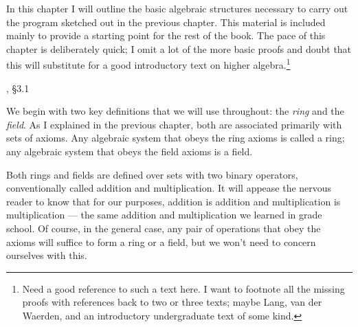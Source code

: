 

\begin{comment}
The author of a mathematics text, really any text in a technical
subject, is faced with a difficult choice --- how much to leave out?
How often to refer readers to references?  How much knowledge
to presuppose?

Now, in the early twenty-first century, we are faced with
technological changes that affect the author's approach.  First, we
have the ability to distribute very large books, file size being a
slight or absent impediment.  Also, we have a political and economic
structure that relies heavily on using copyright to restrict and
control information flow.  These factor have influenced me to decide
in favor of writing a larger and more comprehensive text, that aims to
introduce abstract algebra as much it tries to teach integration
theory.
\end{comment}

In this chapter I will outline the basic algebraic structures
necessary to carry out the program sketched out in the previous
chapter.  This material is included mainly to provide a starting point
for the rest of the book. The pace of this chapter is
deliberately quick; I omit a lot of the more basic proofs and doubt
that this will substitute for a good introductory text on higher
algebra.\footnote{Need a good reference to such a text here.
I want to footnote all the missing proofs with references
back to two or three texts; maybe Lang, van der Waerden,
and an introductory undergraduate text of some kind.}

, \S3.1

We begin with two key definitions that we will use throughout: the
{\it ring} and the {\it field}.  As I explained in the previous
chapter, both are associated primarily with sets of axioms.  Any
algebraic system that obeys the ring axioms is called a ring; any
algebraic system that obeys the field axioms is a field.

Both rings and fields are defined over sets with two binary operators,
conventionally called addition and multiplication.  It will appease
the nervous reader to know that for our purposes,
addition is addition and multiplication is multiplication --- the same
addition and multiplication we learned in grade school.  Of
course, in the general case, any pair of operations that obey the
axioms will suffice to form a ring or a field, but we won't need to
concern ourselves with this.

